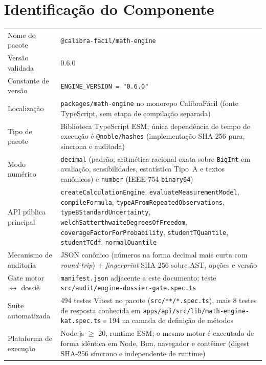 \documentclass[11pt,a4paper]{article}
\newcommand{\docVersion}{0.6.0}
\begin{document}
\section{Identificação do Componente}

\begin{tabularx}{\textwidth}{l X}
  \toprule
  Nome do pacote          & \texttt{@calibra-facil/math-engine} \\
  Versão validada         & \docVersion \\
  Constante de versão     & \texttt{ENGINE\_VERSION = "\docVersion"} \\
  Localização             & \texttt{packages/math-engine} no monorepo CalibraFácil (fonte TypeScript, sem etapa de compilação separada) \\
  Tipo de pacote          & Biblioteca TypeScript ESM; única dependência de tempo de execução é \texttt{@noble/hashes} (implementação SHA-256 pura, síncrona e auditada) \\
  Modo numérico           & \texttt{decimal} (padrão; aritmética racional exata sobre \texttt{BigInt} em avaliação, sensibilidades, estatística Tipo~A e textos canônicos) e \texttt{number} (IEEE-754 \texttt{binary64}) \\
  API pública principal   & \texttt{createCalculationEngine}, \texttt{evaluateMeasurementModel}, \texttt{compileFormula}, \texttt{typeAFromRepeatedObservations}, \texttt{typeBStandardUncertainty}, \texttt{welchSatterthwaiteDegreesOfFreedom}, \texttt{coverageFactorForProbability}, \texttt{studentTQuantile}, \texttt{studentTCdf}, \texttt{normalQuantile} \\
  Mecanismo de auditoria  & JSON canônico (números na forma decimal mais curta com \emph{round-trip}) + \emph{fingerprint} SHA-256 sobre AST, opções e versão \\
  Gate motor \(\leftrightarrow\) dossiê & \texttt{manifest.json} adjacente a este documento; teste \texttt{src/audit/engine-dossier-gate.spec.ts} \\
  Suíte automatizada      & 494 testes Vitest no pacote (\texttt{src/**/*.spec.ts}), mais 8 testes de resposta conhecida em \texttt{apps/api/src/lib/math-engine-kat.spec.ts} e 194 na camada de definição de métodos \\
  Plataforma de execução  & Node.js \(\geq\) 20, runtime ESM; o mesmo motor é executado de forma idêntica em Node, Bun, navegador e contêiner (digest SHA-256 síncrono e independente de runtime) \\
  \bottomrule
\end{tabularx}
\end{document}
